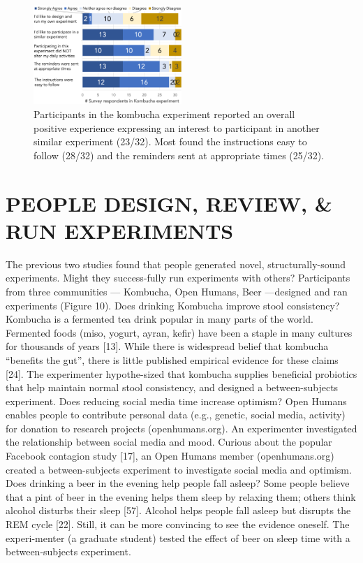 \begin{figure}[h] 
\centering
  \includegraphics[width=0.5\textwidth]{figures/galileo/galileo-study3-2}
  \caption[]
{Participants in the kombucha experiment reported an overall positive experience expressing an interest to participant in another similar experiment (23/32). Most found the instructions easy to follow (28/32) and the reminders sent at appropriate times (25/32). }
  \label{fig:galileo-result3-2}
\end{figure}


\section{PEOPLE DESIGN, REVIEW, \& RUN EXPERIMENTS}
The previous two studies found that people generated novel, structurally-sound experiments. Might they success-fully run experiments with others? Participants from three communities — Kombucha, Open Humans, Beer —designed and ran experiments (Figure 10).  
Does drinking Kombucha improve stool consistency? Kombucha is a fermented tea drink popular in many parts of the world. Fermented foods (miso, yogurt, ayran, kefir) have been a staple in many cultures for thousands of years [13]. While there is widespread belief that kombucha “benefits the gut”, there is little published empirical evidence for these claims [24]. The experimenter hypothe-sized that kombucha supplies beneficial probiotics that help maintain normal stool consistency, and designed a between-subjects experiment.
Does reducing social media time increase optimism? Open Humans enables people to contribute personal data (e.g., genetic, social media, activity) for donation to research projects (openhumans.org). An experimenter investigated the relationship between social media and mood. Curious about the popular Facebook contagion study [17], an Open Humans member (openhumans.org) created a between-subjects experiment to investigate social media and optimism. 
Does drinking a beer in the evening help people fall asleep? Some people believe that a pint of beer in the evening helps them sleep by relaxing them; others think alcohol disturbs their sleep [57]. Alcohol helps people fall asleep but disrupts the REM cycle [22]. Still, it can be more convincing to see the evidence oneself. The experi-menter (a graduate student) tested the effect of beer on sleep time with a between-subjects experiment. 


